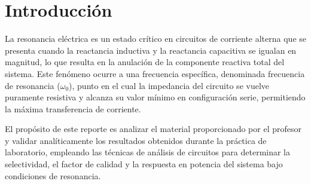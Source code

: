 \section{Introducción}

La resonancia eléctrica es un estado crítico en circuitos de corriente alterna que se presenta cuando la reactancia inductiva y la reactancia capacitiva se igualan en magnitud, lo que resulta en la anulación de la componente reactiva total del sistema. Este fenómeno ocurre a una frecuencia específica, denominada frecuencia de resonancia ($\omega_0$), punto en el cual la impedancia del circuito se vuelve puramente resistiva y alcanza su valor mínimo en configuración serie, permitiendo la máxima transferencia de corriente. \newline

El propósito de este reporte es analizar el material proporcionado por el profesor y validar analíticamente los resultados obtenidos durante la práctica de laboratorio, empleando las técnicas de análisis de circuitos para determinar la selectividad, el factor de calidad y la respuesta en potencia del sistema bajo condiciones de resonancia.